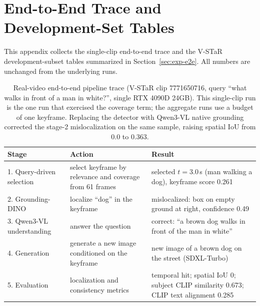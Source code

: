 
\section{End-to-End Trace and Development-Set Tables}\label{app:e2e}

This appendix collects the single-clip end-to-end trace and the V-STaR development-subset tables summarized in Section~\ref{sec:exp-e2e}. All numbers are unchanged from the underlying runs.

\begin{table}[htbp]
\centering
\small
\begin{tabular}{p{2.4cm}p{5.2cm}p{6.4cm}}
\toprule
Stage & Action & Result \\
\midrule
1. Query-driven selection & select keyframe by relevance and coverage from 61 frames & selected $t=3.0$\,s (man walking a dog), keyframe score 0.261 \\
2. Grounding-DINO & localize ``dog'' in the keyframe & mislocalized: box on empty ground at right, confidence 0.49 \\
3. Qwen3-VL understanding & answer the question & correct: ``a brown dog walks in front of the man in white'' \\
4. Generation & generate a new image conditioned on the keyframe & new image of a brown dog on the street (SDXL-Turbo) \\
5. Evaluation & localization and consistency metrics & temporal hit; spatial IoU 0; subject CLIP similarity 0.673; CLIP text alignment 0.285 \\
\bottomrule
\end{tabular}
\caption{Real-video end-to-end pipeline trace (V-STaR clip 7771650716, query ``what walks in front of a man in white?'', single RTX 4090D 24GB). This single-clip run is the one run that exercised the coverage term; the aggregate runs use a budget of one keyframe. Replacing the detector with Qwen3-VL native grounding corrected the stage-2 mislocalization on the same sample, raising spatial IoU from 0.0 to 0.363.}
\label{tab:trace}
\end{table}

